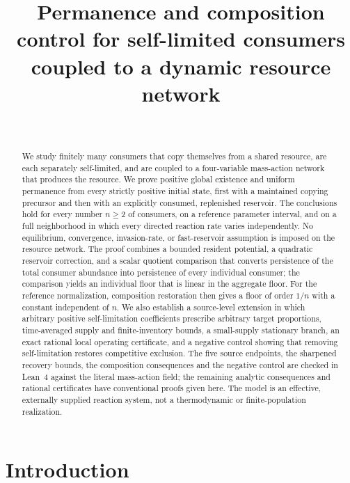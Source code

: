 \documentclass[11pt,a4paper]{article}
\title{Permanence and composition control for self-limited consumers coupled to a dynamic resource network}
\author{\PaperAuthor\\[2pt]{\small\itshape\PaperAffiliation}}
\date{\PaperDate}
\theoremstyle{plain}
\theoremstyle{definition}
\theoremstyle{remark}
\begin{document}
\maketitle

\begin{abstract}
We study finitely many consumers that copy themselves from a shared resource, are each separately self-limited, and are coupled to a four-variable mass-action network that produces the resource. We prove positive global existence and uniform permanence from every strictly positive initial state, first with a maintained copying precursor and then with an explicitly consumed, replenished reservoir. The conclusions hold for every number $n\ge2$ of consumers, on a reference parameter interval, and on a full neighborhood in which every directed reaction rate varies independently. No equilibrium, convergence, invasion-rate, or fast-reservoir assumption is imposed on the resource network. The proof combines a bounded resident potential, a quadratic reservoir correction, and a scalar quotient comparison that converts persistence of the total consumer abundance into persistence of every individual consumer; the comparison yields an individual floor that is linear in the aggregate floor. For the reference normalization, composition restoration then gives a floor of order $1/n$ with a constant independent of $n$. We also establish a source-level extension in which arbitrary positive self-limitation coefficients prescribe arbitrary target proportions, time-averaged supply and finite-inventory bounds, a small-supply stationary branch, an exact rational local operating certificate, and a negative control showing that removing self-limitation restores competitive exclusion. The five source endpoints, the sharpened recovery bounds, the composition consequences and the negative control are checked in Lean~4 against the literal mass-action field; the remaining analytic consequences and rational certificates have conventional proofs given here. The model is an effective, externally supplied reaction system, not a thermodynamic or finite-population realization.
\end{abstract}

\section{Introduction}\label{sec:intro}
\end{document}
